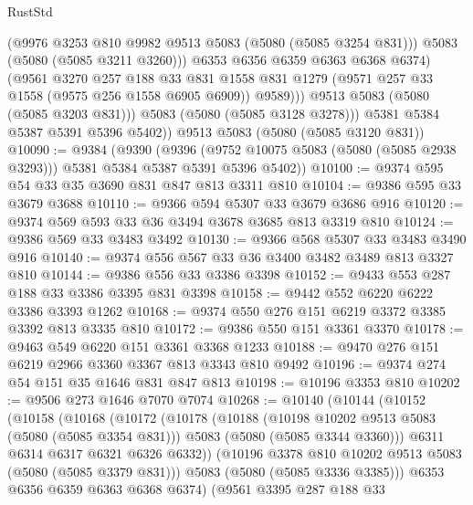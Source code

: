\begin{lexlean}{RustStd}
\begin{coremodule}
                    (@9976 @3253 @810 @9982 @9513 @5083 (@5080 (@5085 @3254 @831)))
                    @5083
                    (@5080 (@5085 @3211 @3260)))
                  @6353
                  @6356
                  @6359
                  @6363
                  @6368
                  @6374)
                (@9561
                  @3270
                  @257
                  @188
                  @33
                  @831
                  @1558
                  @831
                  @1279
                  (@9571 @257 @33 @1558 (@9575 @256 @1558 @6905 @6909))
                  @9589)))
            @9513
            @5083
            (@5080 (@5085 @3203 @831)))
          @5083
          (@5080 (@5085 @3128 @3278)))
        @5381
        @5384
        @5387
        @5391
        @5396
        @5402))
    @9513
    @5083
    (@5080 (@5085 @3120 @831))
@10090 := @9384
    (@9390
      (@9396 (@9752 @10075 @5083 (@5080 (@5085 @2938 @3293))) @5381 @5384 @5387 @5391 @5396 @5402))
@10100 := @9374 @595 @54 @33 @35 @3690 @831 @847 @813 @3311 @810
@10104 := @9386 @595 @33 @3679 @3688
@10110 := @9366 @594 @5307 @33 @3679 @3686 @916
@10120 := @9374 @569 @593 @33 @36 @3494 @3678 @3685 @813 @3319 @810
@10124 := @9386 @569 @33 @3483 @3492
@10130 := @9366 @568 @5307 @33 @3483 @3490 @916
@10140 := @9374 @556 @567 @33 @36 @3400 @3482 @3489 @813 @3327 @810
@10144 := @9386 @556 @33 @3386 @3398
@10152 := @9433 @553 @287 @188 @33 @3386 @3395 @831 @3398
@10158 := @9442 @552 @6220 @6222 @3386 @3393 @1262
@10168 := @9374 @550 @276 @151 @6219 @3372 @3385 @3392 @813 @3335 @810
@10172 := @9386 @550 @151 @3361 @3370
@10178 := @9463 @549 @6220 @151 @3361 @3368 @1233
@10188 := @9470 @276 @151 @6219 @2966 @3360 @3367 @813 @3343 @810 @9492
@10196 := @9374 @274 @54 @151 @35 @1646 @831 @847 @813
@10198 := @10196 @3353 @810
@10202 := @9506 @273 @1646 @7070 @7074
@10268 := @10140
    (@10144
      (@10152
        (@10158
          (@10168
            (@10172
              (@10178
                (@10188
                  (@10198 @10202 @9513 @5083 (@5080 (@5085 @3354 @831)))
                  @5083
                  (@5080 (@5085 @3344 @3360)))
                @6311
                @6314
                @6317
                @6321
                @6326
                @6332))
            (@10196 @3378 @810 @10202 @9513 @5083 (@5080 (@5085 @3379 @831)))
            @5083
            (@5080 (@5085 @3336 @3385)))
          @6353
          @6356
          @6359
          @6363
          @6368
          @6374)
        (@9561
          @3395
          @287
          @188
          @33

\end{coremodule}
\end{lexlean}
